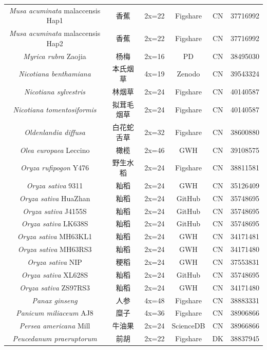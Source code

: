 {{\begin{longtable}{cccccc}
    \textit{Musa acuminata} malaccensis Hap1 & 香蕉 & 2x=22 & Figshare & CN & 37716992 \\
    \textit{Musa acuminata} malaccensis Hap2 & 香蕉 & 2x=22 & Figshare & CN & 37716992 \\
    \textit{Myrica rubra} Zaojia & 杨梅 & 2x=16 & PD & CN & 38495030 \\
    \textit{Nicotiana benthamiana} & 本氏烟草 & 4x=19 & Zenodo & CN & 39543324 \\
    \textit{Nicotiana sylvestris} & 林烟草 & 2x=24 & Figshare & CN & 40140587 \\
    \textit{Nicotiana tomentosiformis} & 拟茸毛烟草 & 2x=24 & Figshare & CN & 40140587 \\
    \textit{Oldenlandia diffusa} & 白花蛇舌草 & 2x=32 & Figshare & CN & 38600880 \\
    \textit{Olea europaea} Leccino & 橄榄 & 2x=46 & GWH & CN & 39108575 \\
    \textit{Oryza rufipogon} Y476 & 野生水稻 & 2x=24 & Figshare & CN & 38811581 \\
    \textit{Oryza sativa} 9311 & 籼稻 & 2x=24 & GWH & CN & 35126409 \\
    \textit{Oryza sativa} HuaZhan & 籼稻 & 2x=24 & GitHub & CN & 35748695 \\
    \textit{Oryza sativa} J4155S & 籼稻 & 2x=24 & GitHub & CN & 35748695 \\
    \textit{Oryza sativa} LK638S & 籼稻 & 2x=24 & GitHub & CN & 35748695 \\
    \textit{Oryza sativa} MH63KL1 & 籼稻 & 2x=24 & GWH & CN & 34171481 \\
    \textit{Oryza sativa} MH63RS3 & 籼稻 & 2x=24 & GWH & CN & 34171480 \\
    \textit{Oryza sativa} NIP & 粳稻 & 2x=24 & GWH & CN & 37553831 \\
    \textit{Oryza sativa} XL628S & 籼稻 & 2x=24 & GitHub & CN & 35748695 \\
    \textit{Oryza sativa} ZS97RS3 & 籼稻 & 2x=24 & GWH & CN & 34171480 \\
    \textit{Panax ginseng} & 人参 & 4x=48 & Figshare & CN & 38883331 \\
    \textit{Panicum miliaceum} AJ8 & 糜子 & 4x=36 & Figshare & CN & 38906866 \\
    \textit{Persea americana} Mill & 牛油果 & 2x=24 & ScienceDB & CN & 38966866 \\
    \textit{Peucedanum praeruptorum} & 前胡 & 2x=22 & Figshare & DK & 38837945 \\

\end{longtable}}}
